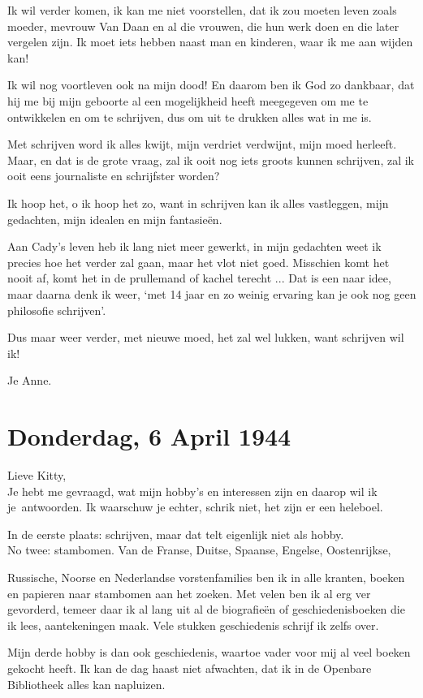 \documentclass{book}
\begin{document}
Ik wil verder komen, ik kan me niet voorstellen, dat ik zou moeten leven zoals
moeder, mevrouw Van Daan en al die vrouwen, die hun werk doen en die later
vergelen zijn. Ik moet iets hebben naast man en kinderen, waar ik me aan wijden
kan!

Ik wil nog voortleven ook na mijn dood! En daarom ben ik God zo dankbaar, dat
hij me bij mijn geboorte al een mogelijkheid heeft meegegeven om me te
ontwikkelen en om te schrijven, dus om uit te drukken alles wat in me is.

Met schrijven word ik alles kwijt, mijn verdriet verdwijnt, mijn moed herleeft.
Maar, en dat is de grote vraag, zal ik ooit nog iets groots kunnen schrijven,
zal ik ooit eens journaliste en schrijfster worden?

Ik hoop het, o ik hoop het zo, want in schrijven kan ik alles vastleggen, mijn
gedachten, mijn idealen en mijn fantasieën.

Aan Cady's leven heb ik lang niet meer gewerkt, in mijn gedachten weet ik
precies hoe het verder zal gaan, maar het vlot niet goed. Misschien komt het
nooit af, komt het in de prullemand of kachel terecht ... Dat is een naar idee,
maar daarna denk ik weer, `met 14 jaar en zo weinig ervaring kan je ook nog geen
philosofie schrijven'.

Dus maar weer verder, met nieuwe moed, het zal wel lukken, want schrijven wil
ik!

Je Anne.

\section*{Donderdag, 6 April 1944}

Lieve Kitty,\\
Je hebt me gevraagd, wat mijn hobby's en interessen zijn en
daarop wil ik je~antwoorden. Ik waarschuw je echter, schrik niet, het zijn er
een heleboel.

In de eerste plaats: schrijven, maar dat telt eigenlijk niet als hobby.\\
No
twee: stambomen. Van de Franse, Duitse, Spaanse, Engelse, Oostenrijkse,

Russische, Noorse en Nederlandse vorstenfamilies ben ik in alle kranten, boeken
en papieren naar stambomen aan het zoeken. Met velen ben ik al erg ver
gevorderd, temeer daar ik al lang uit al de biografieën of geschiedenisboeken
die ik lees, aantekeningen maak. Vele stukken geschiedenis schrijf ik zelfs
over.

Mijn derde hobby is dan ook geschiedenis, waartoe vader voor mij al veel boeken
gekocht heeft. Ik kan de dag haast niet afwachten, dat ik in de Openbare
Bibliotheek alles kan napluizen.
\end{document}
